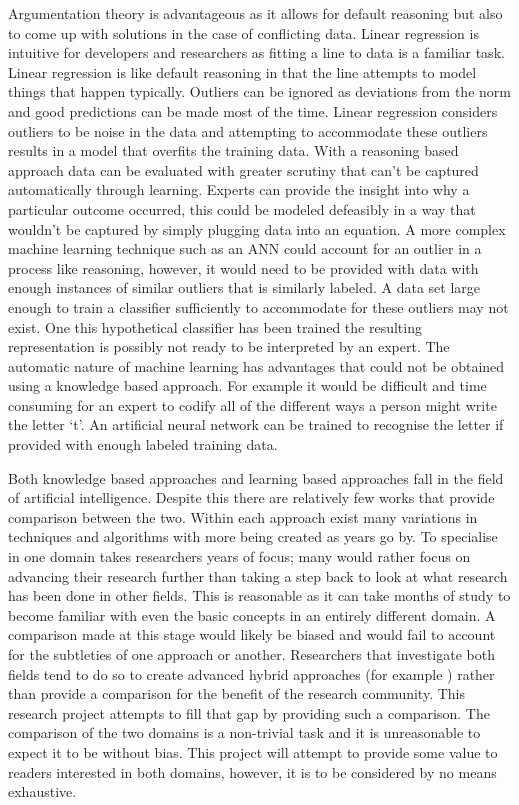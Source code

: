 Argumentation theory is advantageous as it allows for default reasoning but also to come up with solutions in the case of conflicting data. Linear regression is intuitive for developers and researchers as fitting a line to data is a familiar task. Linear regression is like default reasoning in that the line attempts to model things that happen typically. Outliers can be ignored as deviations from the norm and good predictions can be made most of the time. Linear regression considers outliers to be noise in the data and attempting to accommodate these outliers results in a model that overfits the training data. With a reasoning based approach data can be evaluated with greater scrutiny that can't be captured automatically through learning. Experts can provide the insight into why a particular outcome occurred, this could be modeled defeasibly in a way that wouldn't be captured by simply plugging data into an equation. A more complex machine learning technique such as an ANN could account for an outlier in a process like reasoning, however, it would need to be provided with data with enough instances of similar outliers that is similarly labeled. A data set large enough to train a classifier sufficiently to accommodate for these outliers may not exist. One this hypothetical classifier has been trained the resulting representation is possibly not ready to be interpreted by an expert. The automatic nature of machine learning has advantages that could not be obtained using a knowledge based approach. For example it would be difficult and time consuming for an expert to codify all of the different ways a person might write the letter `t'. An artificial neural network can be trained to recognise the letter if provided with enough labeled training data.

Both knowledge based approaches and learning based approaches fall in the field of artificial intelligence. Despite this there are relatively few works that provide comparison between the two. Within each approach exist many variations in techniques and algorithms with more being created as years go by. To specialise in one domain takes researchers years of focus; many would rather focus on advancing their research further than taking a step back to look at what research has been done in other fields. This is reasonable as it can take months of study to become familiar with even the basic concepts in an entirely different domain. A comparison made at this stage would likely be biased and would fail to account for the subtleties of one approach or another. Researchers that investigate both fields tend to do so to create advanced hybrid approaches (for example \cite{gomez2004hybrid}) rather than provide a comparison for the benefit of the research community. This research project attempts to fill that gap by providing such a comparison. The comparison of the two domains is a non-trivial task and it is unreasonable to expect it to be without bias. This project will attempt to provide some value to readers interested in both domains, however, it is to be considered by no means exhaustive.

